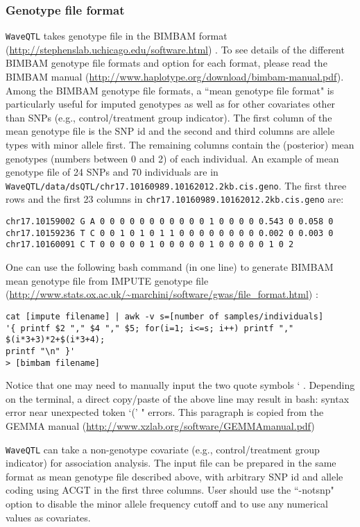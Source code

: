 \documentclass[11pt]{article}
\begin{document}
\subsubsection{Genotype file format}
{\tt WaveQTL} takes genotype file in the BIMBAM format (\url{http://stephenslab.uchicago.edu/software.html}) \cite{Servin2007}. To see details of the different BIMBAM genotype file formats and option for each format, please read the BIMBAM manual (\url{http://www.haplotype.org/download/bimbam-manual.pdf}). Among the BIMBAM genotype file formats, a ``mean genotype file format" is particularly useful for imputed genotypes as well as for other covariates other than SNPs (e.g., control/treatment group indicator). The first column of the mean genotype file is the SNP id and the second and third columns are allele types with minor allele first. The remaining columns contain the (posterior) mean genotypes (numbers between 0 and 2) of each individual. An example of mean genotype file of 24 SNPs and 70 individuals are in {\tt WaveQTL/data/dsQTL/chr17.10160989.10162012.2kb.cis.geno}. The first three rows and the first 23 columns in {\tt chr17.10160989.10162012.2kb.cis.geno} are:
\begin{verbatim}
chr17.10159002 G A 0 0 0 0 0 0 0 0 0 0 0 1 0 0 0 0 0.543 0 0.058 0
chr17.10159236 T C 0 0 1 0 1 0 1 1 0 0 0 0 0 0 0 0 0.002 0 0.003 0 
chr17.10160091 C T 0 0 0 0 0 1 0 0 0 0 0 1 0 0 0 0 0 1 0 2 
\end{verbatim}

One can use the following bash command (in one line) to generate BIMBAM mean genotype file from IMPUTE genotype file (\url{http://www.stats.ox.ac.uk/~marchini/software/gwas/file_format.html}) \cite{Howie2009}:
\begin{verbatim}
cat [impute filename] | awk -v s=[number of samples/individuals]
'{ printf $2 "," $4 "," $5; for(i=1; i<=s; i++) printf "," $(i*3+3)*2+$(i*3+4); 
printf "\n" }'
> [bimbam filename]
\end{verbatim}
Notice that one may need to manually input the two quote symbols ` . Depending on the terminal,
a direct copy/paste of the above line may result in \-bash: syntax error near unexpected token `('
" errors. This paragraph is copied from the GEMMA manual (\url{http://www.xzlab.org/software/GEMMAmanual.pdf})

{\tt WaveQTL} can take a non-genotype covariate (e.g., control/treatment group indicator) for association analysis. The input file can be prepared in the same format as mean genotype file described above, with arbitrary SNP id and allele coding using ACGT in the first three columns. User should use the ``-notsnp" option to disable the minor allele frequency cutoff and to use any numerical values as covariates.
\end{document}
